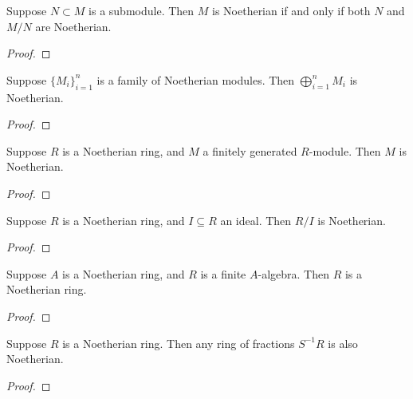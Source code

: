 \begin{theorem}
    Suppose \(N \subset M\) is a submodule.
    Then \(M\) is Noetherian if and only if both \(N\) and \(M/N\) are Noetherian.
\end{theorem}
\begin{proof}
    
\end{proof}
\begin{corollary}
    Suppose \({\{M_i\}}_{i=1}^n\) is a family of Noetherian modules.
    Then \(\bigoplus_{i=1}^n M_i\) is Noetherian.
\end{corollary}
\begin{proof}
    
\end{proof}
\begin{corollary}
    Suppose \(R\) is a Noetherian ring,
    and \(M\) a finitely generated \(R\)-module.
    Then \(M\) is Noetherian.
\end{corollary}
\begin{proof}
    
\end{proof}
\begin{corollary}
    Suppose \(R\) is a Noetherian ring,
    and \(I \subseteq R\) an ideal.
    Then \(R/I\) is Noetherian.
\end{corollary}
\begin{proof}
    
\end{proof}

\begin{theorem}
    Suppose \(A\) is a Noetherian ring, and \(R\) is a finite \(A\)-algebra.
    Then \(R\) is a Noetherian ring.
\end{theorem}
\begin{proof}
    
\end{proof}
\begin{theorem}
    Suppose \(R\) is a Noetherian ring.
    Then any ring of fractions \(S^{-1}R\) is also Noetherian.
\end{theorem}
\begin{proof}
    
\end{proof}

